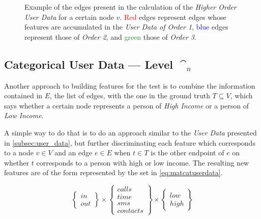 
\begin{figure}
\centering
\framebox[\columnwidth]{%
	
}
\caption{Example of the edges present in the calculation of the \emph{Higher Order User Data} for a certain node $v$. \textcolor{red}{Red} edges represent edges whose features are accumulated in the \emph{User Data of Order 1}, \textcolor{blue}{blue} edges represent those of \emph{Order 2}, and \textcolor{ForestGreen}{green} those of \emph{Order 3}.}
\label{fig:higherorderuserdata}
\end{figure}

\subsection{Categorical User Data --- Level $\cat_n$}
\label{subsec:categoricaluserdata}

Another approach to building features for the test is to combine the information contained in $E$, the list of edges, with the one in the ground truth $T \subseteq V$, which says whether a certain node represents a person of \emph{High Income} or a person of \emph{Low Income}.



A simple way to do that is to do an approach similar to the \emph{User Data} presented in \cref{subsec:user_data}, but further discriminating each feature which corresponds to a node $v \in V$ and an edge $e \in E$ when $t \in T$ is the other endpoint of $e$ on whether $t$ corresponds to a person with high or low income. The resulting new features are of the form represented by the set in \cref{eq:matcatuserdata}.

\begin{equation}
\begin{Bmatrix} in \\ out \end{Bmatrix}
\times
\begin{Bmatrix} calls \\ time \\ sms \\ contacts \end{Bmatrix}
\times
\begin{Bmatrix} low \\ high \end{Bmatrix}
\label{eq:matcatuserdata}
\end{equation}


